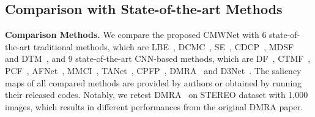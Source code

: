 \documentclass[runningheads]{llncs}
\begin{document}
\subsection{Comparison with State-of-the-art Methods}
\noindent\textbf{Comparison Methods.} 
We compare the proposed CMWNet with 6 state-of-the-art traditional methods, which are
LBE~\cite{Feng2016LBE}, DCMC~\cite{Cong2016SPL},
SE~\cite{Guo2016ICME}, CDCP~\cite{Zhu2017CDCP},
MDSF~\cite{Song2017MDSF} and DTM~\cite{Cong2019DTM},
and 9 state-of-the-art CNN-based methods, which are
DF~\cite{Qu2017DF}, CTMF~\cite{Han2018CTMF},
PCF~\cite{Chen2018PCF}, AFNet~\cite{Wang2019AFNet},
MMCI~\cite{Chen2019MMCI}, TANet~\cite{Chen2019TANet},
CPFP~\cite{Zhao2019CPFP}, DMRA~\cite{LHC2019DMRA}
and D3Net~\cite{Fan2019D3Net}.
The saliency maps of all compared methods are provided
by authors or obtained by running their released codes.
Notably, we retest DMRA~\cite{LHC2019DMRA} on STEREO dataset with 1,000 images,
which results in different performances from the original DMRA paper.
\end{document}
